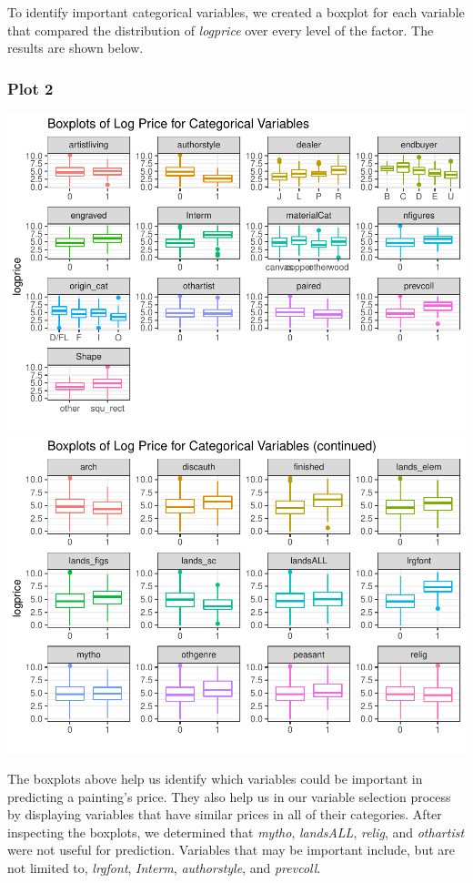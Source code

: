 \documentclass[]{article}
\begin{document}
To identify important categorical variables, we created a boxplot for
each variable that compared the distribution of \emph{logprice} over
every level of the factor. The results are shown below.

\hypertarget{plot-2}{%
\subsubsection{Plot 2}\label{plot-2}}

\includegraphics{Part-I-Writeup_files/figure-latex/eda-1.pdf}
\includegraphics{Part-I-Writeup_files/figure-latex/eda-2.pdf}

The boxplots above help us identify which variables could be important
in predicting a painting's price. They also help us in our variable
selection process by displaying variables that have similar prices in
all of their categories. After inspecting the boxplots, we determined
that \emph{mytho}, \emph{landsALL}, \emph{relig}, and \emph{othartist}
were not useful for prediction. Variables that may be important include,
but are not limited to, \emph{lrgfont}, \emph{Interm},
\emph{authorstyle}, and \emph{prevcoll}.
\end{document}
